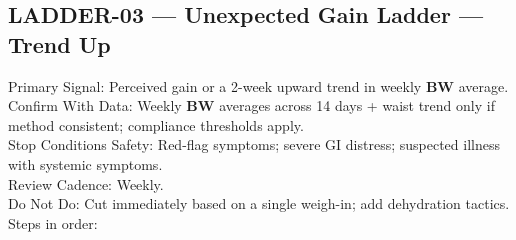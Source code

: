 \documentclass[10pt]{article}
\begin{document}
\newpage

\subsection*{LADDER-03 — Unexpected Gain Ladder — Trend Up}
{}

Primary Signal: Perceived gain or a 2-week upward trend in weekly \textbf{BW} average.\\
Confirm With Data: Weekly \textbf{BW} averages across 14 days + waist trend only if method consistent; compliance thresholds apply.\\
Stop Conditions Safety: Red-flag symptoms; severe GI distress; suspected illness with systemic symptoms.\\
Review Cadence: Weekly.\\
Do Not Do: Cut immediately based on a single weigh-in; add dehydration tactics.\\
Steps in order:
\end{document}

